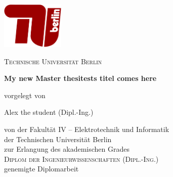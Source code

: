 
\begin{titlepage}
  \begin{center}
	  


	\centering
	\includegraphics[width=3cm]{figures/tub.pdf}\\
	\vspace{0.8em}
	\LARGE 

	\textsc{Technische Universit\"at Berlin}

    \vspace{1cm}

    \sffamily \LARGE \textbf{My new Master thesitests titel comes here}

    \vspace{1.5cm}





    \normalsize vorgelegt von

    \vspace{.1cm}

    \large Alex the student (Dipl.-Ing.)

    \vspace{.8cm}



    \normalsize von der Fakult\"{a}t IV -- Elektrotechnik und Informatik\\
    \normalsize der Technischen Universit\"{a}t Berlin\\
    \normalsize zur Erlangung des akademischen Grades\\
    \large \textsc{Diplom der Ingenieurwissenschaften (Dipl.-Ing.)}\\
    \normalsize genemigte Diplomarbeit\\

    \vspace{1cm}


\end{center}
\end{titlepage}
